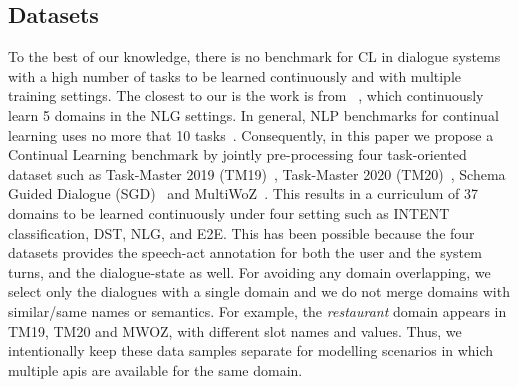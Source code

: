 \documentclass[11pt,a4paper]{article}
\begin{document}
\begin{table}[t]
\caption{Main datasets statistics. }
\label{tab:mainstat}
\end{table}

\subsection{Datasets}
To the best of our knowledge, there is no benchmark for CL in dialogue systems with a high number of tasks to be learned continuously and with multiple training settings. The closest to our is the work is from ~\citet{mi2020continual}, which continuously learn 5 domains in the NLG settings. In general, NLP benchmarks for continual learning uses no more that 10 tasks~\cite{sun2019lamol,d2019episodic}. Consequently, in this paper we propose a Continual Learning benchmark by jointly pre-processing four task-oriented dataset such as Task-Master 2019 (TM19)~\cite{byrne-etal-2019-taskmaster}, Task-Master 2020 (TM20)~\cite{byrne-etal-2019-taskmaster}, Schema Guided Dialogue (SGD)~\cite{rastogi2019towards} and MultiWoZ~\cite{budzianowski2018large}. This results in a curriculum of 37 domains to be learned continuously under four setting such as INTENT classification, DST, NLG, and E2E. This has been possible because the four datasets provides the speech-act annotation for both the user and the system turns, and the dialogue-state as well. For avoiding any domain overlapping, we select only the dialogues with a single domain and we do not merge domains with similar/same names or semantics. For example, the \textit{restaurant} domain appears in TM19, TM20 and MWOZ, with different slot names and values. Thus, we intentionally keep these data samples separate for modelling scenarios in which multiple apis are available for the same domain. 
\end{document}
